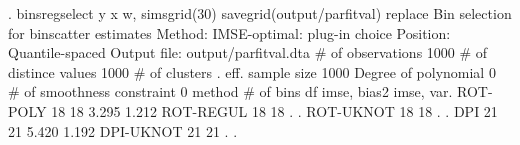 . binsregselect y x w, simsgrid(30) savegrid(output/parfitval) replace
{\smallskip}
{\smallskip}
Bin selection for binscatter estimates
Method: IMSE-optimal: plug-in choice
Position: Quantile-spaced
Output file: output/parfitval.dta
{\smallskip}
          \# of observations {\VBAR}    1000
       \# of distince values {\VBAR}    1000
              \# of clusters {\VBAR}       .
           eff. sample size {\VBAR}    1000
       Degree of polynomial {\VBAR}       0
 \# of smoothness constraint {\VBAR}       0
{\smallskip}
    method    {\VBAR}  \# of bins {\VBAR}     df   {\VBAR} imse, bias{\caret}2 {\VBAR}  imse, var.  
   ROT-POLY   {\VBAR}      18    {\VBAR}     18   {\VBAR}    3.295     {\VBAR}    1.212
   ROT-REGUL  {\VBAR}      18    {\VBAR}     18   {\VBAR}        .     {\VBAR}        .
   ROT-UKNOT  {\VBAR}      18    {\VBAR}     18   {\VBAR}        .     {\VBAR}        .
      DPI     {\VBAR}      21    {\VBAR}     21   {\VBAR}    5.420     {\VBAR}    1.192
   DPI-UKNOT  {\VBAR}      21    {\VBAR}     21   {\VBAR}        .     {\VBAR}        .
